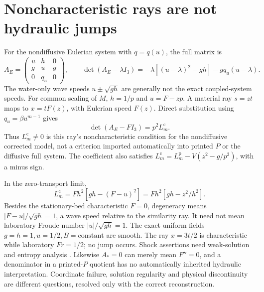 \documentclass[11pt,a4paper,oneside]{report}
\numberwithin{equation}{chapter}
\begin{document}
\section{Noncharacteristic rays are not hydraulic jumps}\label{sec:characteristics}
For the nondiffusive Eulerian system with $q=q(u)$, the full matrix is
\begin{equation}\label{eq:AE}
A_E=\begin{pmatrix}u&h&0\\g&u&g\\0&q_u&0\end{pmatrix},\qquad
\det(A_E-\lambda I_3)
=-\lambda[(u-\lambda)^2-gh]-gq_u(u-\lambda).
\end{equation}
The water-only wave speeds $u\pm\sqrt{gh}$ are generally not the exact
coupled-system speeds. For common scaling of $M$, $h=1/p$ and $u=F-zp$.
A material ray $s=zt$ maps to $x=tF(z)$, with Eulerian speed $F(z)$.
Direct substitution using $q_u=\beta u^{m-1}$ gives
\begin{equation}\label{eq:characteristic-identity}
\boxed{\det(A_E-FI_3)=p^2L_m^{\mathrm c}.}
\end{equation}
Thus $L_m^{\mathrm c}\ne0$ is this ray's noncharacteristic condition for
the nondiffusive corrected model, not a criterion imported automatically
into printed $P$ or the diffusive full system. The coefficient also satisfies
$L_m^{\mathrm c}=L_m^{\mathrm p}-V(z^2-g/p^3)$, with a minus sign.

In the zero-transport limit,
\begin{equation}\label{eq:no-transport}
\boxed{L_m^{\mathrm c}=Fh^2[gh-(F-u)^2]=Fh^2[gh-z^2/h^2].}
\end{equation}
Besides the stationary-bed characteristic $F=0$, degeneracy means
$|F-u|/\sqrt{gh}=1$, a wave speed relative to the similarity ray.
It need not mean laboratory Froude number $|u|/\sqrt{gh}=1$.
The exact uniform fields $g=h=1,u=1/2,B=\mathrm{constant}$ are smooth.
The ray $x=3t/2$ is characteristic while laboratory $Fr=1/2$; no jump occurs.
Shock assertions need weak-solution and entropy analysis \cite{clawpack}.
Likewise $A_*=0$ can merely mean $F''=0$, and a denominator in a printed-$P$
quotient has no automatically inherited hydraulic interpretation.
Coordinate failure, solution regularity and physical discontinuity are
different questions, resolved only with the correct reconstruction.
\end{document}

